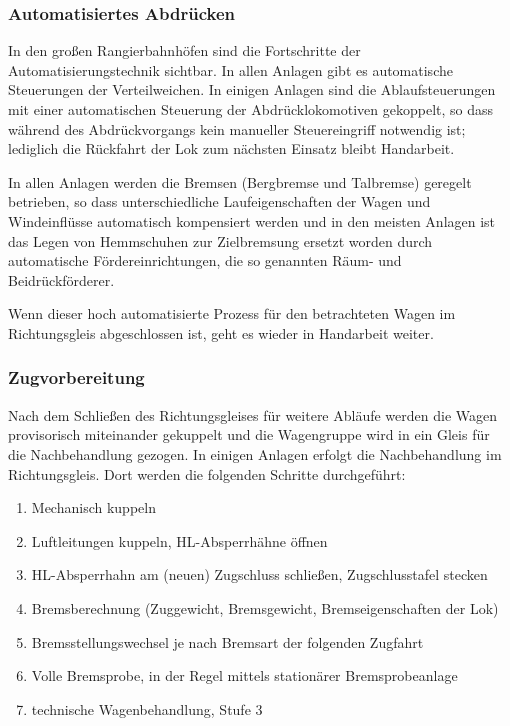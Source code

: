 \subsubsection{Automatisiertes Abdrücken}\label{sec:automAbdruecken}
In den großen Rangierbahnhöfen sind die Fortschritte der Automatisierungstechnik sichtbar. In allen Anlagen gibt es automatische Steuerungen der Verteilweichen. In einigen Anlagen sind die Ablaufsteuerungen mit einer automatischen Steuerung der Abdrücklokomotiven gekoppelt, so dass während des Abdrückvorgangs kein manueller Steuereingriff notwendig ist; lediglich die Rückfahrt der Lok zum nächsten Einsatz bleibt Handarbeit.\par 
In allen Anlagen werden die Bremsen (\gls{Bergbremse} und \gls{Talbremse}) geregelt betrieben, so dass unterschiedliche Laufeigenschaften der Wagen und Windeinflüsse automatisch kompensiert werden und in den meisten Anlagen ist das Legen von Hemmschuhen zur Zielbremsung ersetzt worden durch automatische Fördereinrichtungen, die so genannten Räum- und Beidrückförderer.\par
Wenn dieser hoch automatisierte Prozess für den betrachteten Wagen im Richtungsgleis abgeschlossen ist, geht es wieder in Handarbeit weiter.
\subsubsection{Zugvorbereitung}\label{sec:Zugvorbereitung}
Nach dem Schließen des Richtungsgleises für weitere Abläufe werden die Wagen provisorisch miteinander gekuppelt und die Wagengruppe wird in ein Gleis für die Nachbehandlung gezogen. In einigen Anlagen erfolgt die Nachbehandlung im Richtungsgleis. Dort werden die folgenden Schritte durchgeführt:
\begin{enumerate}
    \item Mechanisch kuppeln
    \item Luftleitungen kuppeln, \acrshort{HL}-Absperrhähne öffnen
    \item \acrshort{HL}-Absperrhahn am (neuen) \gls{Zugschluss} schließen, Zugschlusstafel stecken
    \item Bremsberechnung (Zuggewicht, Bremsgewicht, Bremseigenschaften der Lok)
    \item Bremsstellungswechsel je nach \gls{Bremsart} der folgenden \gls{Zugfahrt}
    \item Volle \gls{Bremsprobe}, in der Regel mittels stationärer \gls{Bremsprobeanlage}
    \item \gls{technische Wagenbehandlung}, Stufe 3
\end{enumerate}
